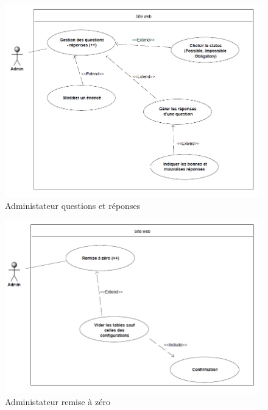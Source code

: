     \begin{figure}[h]
        \begin{center}
            \includegraphics[scale=0.70]{images/uml/adminQuestionsReponses.png} 
        \end{center}

        \caption{Administateur questions et réponses}
        \label{Administateur questions et réponses}
    \end{figure}

    \begin{figure}[h]
        \begin{center}
            \includegraphics[scale=0.70]{images/uml/adminRAZ.png} 
        \end{center}

        \caption{Administateur remise à zéro}
        \label{Administateur remise à zéro}
    \end{figure}

